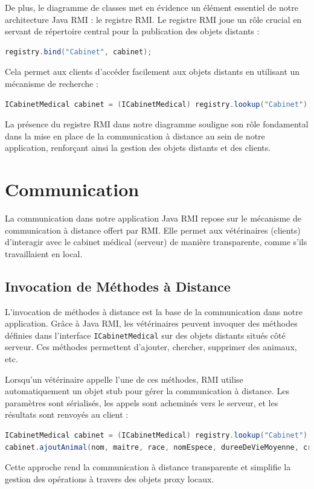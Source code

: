 \documentclass{article} %
\begin{document}
De plus, le diagramme de classes met en évidence un élément essentiel de notre architecture Java RMI :
le registre RMI.
\newline Le registre RMI joue un rôle crucial en servant de répertoire
central pour la publication des objets distants :
\begin{lstlisting}[language=Java]
    registry.bind("Cabinet", cabinet);
\end{lstlisting}
Cela permet aux clients d'accéder facilement aux objets distants
en utilisant un mécanisme de recherche :
\begin{lstlisting}[language=Java]
    ICabinetMedical cabinet = (ICabinetMedical) registry.lookup("Cabinet");
\end{lstlisting}
La présence du registre RMI dans notre diagramme souligne son rôle
fondamental dans la mise en place de la communication à distance au sein de notre application,
renforçant ainsi la gestion des objets distants et des clients.


\newpage
\section{Communication}

La communication dans notre application Java RMI repose sur le mécanisme de
communication à distance offert par RMI.
Elle permet aux vétérinaires (clients) d'interagir avec le cabinet médical (serveur)
de manière transparente, comme s'ils travaillaient en local.

\subsection{Invocation de Méthodes à Distance}

L'invocation de méthodes à distance est la base de la communication dans notre application.
Grâce à Java RMI, les vétérinaires peuvent invoquer des méthodes
définies dans l'interface \texttt{ICabinetMedical} sur des objets distants situés côté serveur.
Ces méthodes permettent d'ajouter, chercher, supprimer des animaux, etc.

Lorsqu'un vétérinaire appelle l'une de ces méthodes,
RMI utilise automatiquement un objet stub pour gérer la communication à distance.
Les paramètres sont sérialisés, les appels sont acheminés vers le serveur,
et les résultats sont renvoyés au client :
\begin{lstlisting}[language=Java]
ICabinetMedical cabinet = (ICabinetMedical) registry.lookup("Cabinet");
cabinet.ajoutAnimal(nom, maitre, race, nomEspece, dureeDeVieMoyenne, cri);
\end{lstlisting}
Cette approche rend la communication à distance transparente
et simplifie la gestion des opérations à travers des objets proxy locaux.
\end{document}
